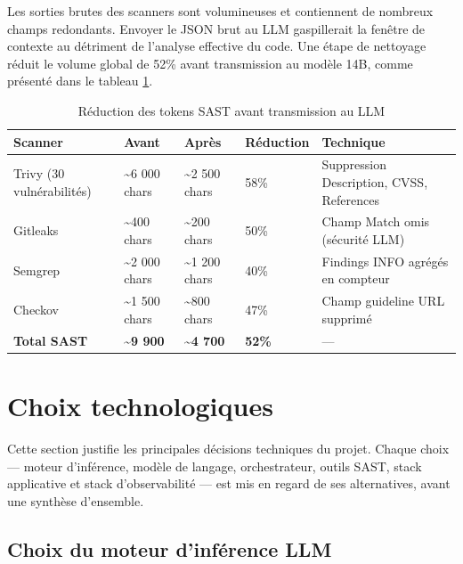         Les sorties brutes des scanners sont volumineuses et contiennent de nombreux champs
        redondants. Envoyer le JSON brut au LLM gaspillerait la fenêtre de contexte au
        détriment de l'analyse effective du code. Une étape de nettoyage réduit le volume
        global de 52\% avant transmission au modèle 14B, comme présenté dans le tableau
        \ref{tab:token_reduction}.

        \begin{table}[H]
        \centering
        \begin{tabular}{|m{3.5cm}|m{2.5cm}|m{2.5cm}|m{2cm}|m{3cm}|}
        \hline
        \textbf{Scanner} & \textbf{Avant} & \textbf{Après} & \textbf{Réduction} & \textbf{Technique} \\
        \hline
        Trivy (30 vulnérabilités) & \textasciitilde6 000 chars & \textasciitilde2 500 chars & 58\% & Suppression Description, CVSS, References \\
        \hline
        Gitleaks & \textasciitilde400 chars & \textasciitilde200 chars & 50\% & Champ Match omis (sécurité LLM) \\
        \hline
        Semgrep & \textasciitilde2 000 chars & \textasciitilde1 200 chars & 40\% & Findings INFO agrégés en compteur \\
        \hline
        Checkov & \textasciitilde1 500 chars & \textasciitilde800 chars & 47\% & Champ guideline URL supprimé \\
        \hline
        \textbf{Total SAST} & \textbf{\textasciitilde9 900} & \textbf{\textasciitilde4 700} & \textbf{52\%} & — \\
        \hline
        \end{tabular}
        \caption{Réduction des tokens SAST avant transmission au LLM}
        \label{tab:token_reduction}
        \end{table}

\section{Choix technologiques}

    Cette section justifie les principales décisions techniques du projet. Chaque choix —
    moteur d'inférence, modèle de langage, orchestrateur, outils SAST, stack applicative et
    stack d'observabilité — est mis en regard de ses alternatives, avant une synthèse
    d'ensemble.

    \subsection{Choix du moteur d'inférence LLM}

